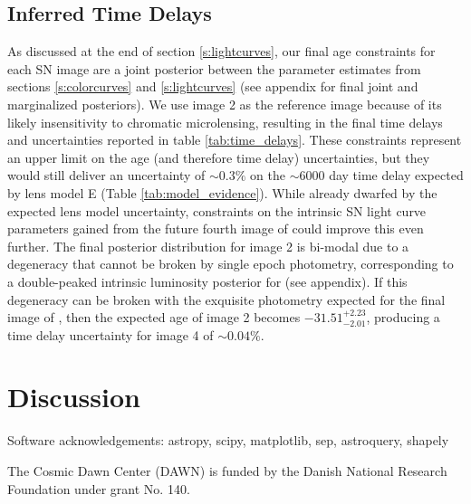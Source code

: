 \documentclass[twocolumn]{aastex63}
\begin{document}
\subsection{Inferred Time Delays}
\label{s:timedelays}
As discussed at the end of section \ref{s:lightcurves}, our final age constraints for each SN image are a joint posterior between the parameter estimates from sections \ref{s:colorcurves} and \ref{s:lightcurves} (see appendix for final joint and marginalized posteriors). We use image 2 as the reference image because of its likely insensitivity to chromatic microlensing,  resulting in the final time delays and uncertainties reported in table \ref{tab:time_delays}. These constraints represent an upper limit on the age (and therefore time delay) uncertainties, but they would still deliver an uncertainty of $\sim0.3\%$ on the $\sim6000$ day time delay expected by lens model E (Table \ref{tab:model_evidence}). While already dwarfed by the expected lens model uncertainty, constraints on the intrinsic SN light curve parameters gained from the future fourth image of \SNABC could improve this even further. The final posterior distribution for image 2 is bi-modal due to a degeneracy that cannot be broken by single epoch photometry, corresponding to a double-peaked intrinsic luminosity posterior for \SNABC (see appendix). If this degeneracy can be broken with the exquisite photometry expected for the final image of \SNABC, then the expected age of image 2 becomes $-31.51^{+2.23}_{-2.01}$, producing a time delay uncertainty for image 4 of $\sim0.04\%$.


\section{Discussion}
\label{s:discussion}

\acknowledgments
Software acknowledgements: astropy, scipy, matplotlib, sep, astroquery, shapely

The Cosmic Dawn Center (DAWN) is funded by the Danish National Research Foundation under grant No. 140. 


\pagebreak






\pagebreak
\end{document}
